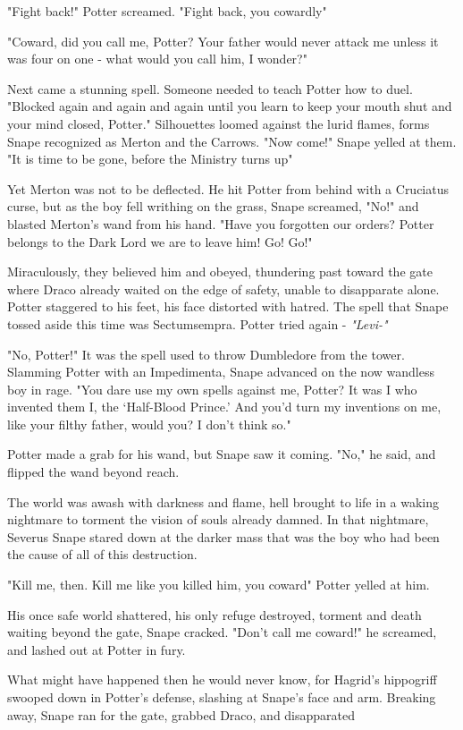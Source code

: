 "Fight back!" Potter screamed. "Fight back, you cowardly{\el}"

"Coward, did you call me, Potter? Your father would never attack me unless it was four on one - what would you call him, I wonder?"

Next came a stunning spell. Someone needed to teach Potter how to duel. "Blocked again and again and again until you learn to keep your mouth shut and your mind closed, Potter." Silhouettes loomed against the lurid flames, forms Snape recognized as Merton and the Carrows. "Now come!" Snape yelled at them. "It is time to be gone, before the Ministry turns up{\el}"

Yet Merton was not to be deflected. He hit Potter from behind with a Cruciatus curse, but as the boy fell writhing on the grass, Snape screamed, "No!" and blasted Merton's wand from his hand. "Have you forgotten our orders? Potter belongs to the Dark Lord{\el} we are to leave him! Go! Go!"

Miraculously, they believed him and obeyed, thundering past toward the gate where Draco already waited on the edge of safety, unable to disapparate alone. Potter staggered to his feet, his face distorted with hatred. The spell that Snape tossed aside this time was Sectumsempra. Potter tried again - \emph{"Levi-"}

"No, Potter!" It was the spell used to throw Dumbledore from the tower. Slamming Potter with an Impedimenta, Snape advanced on the now wandless boy in rage. "You dare use my own spells against me, Potter? It was I who invented them{\el} I, the `Half-Blood Prince.' And you'd turn my inventions on me, like your filthy father, would you? I don't think so."

Potter made a grab for his wand, but Snape saw it coming. "No," he said, and flipped the wand beyond reach.

The world was awash with darkness and flame, hell brought to life in a waking nightmare to torment the vision of souls already damned. In that nightmare, Severus Snape stared down at the darker mass that was the boy who had been the cause of all of this destruction.

"Kill me, then. Kill me like you killed him, you coward{\el}" Potter yelled at him.

His once safe world shattered, his only refuge destroyed, torment and death waiting beyond the gate, Snape cracked. "Don't call me coward!" he screamed, and lashed out at Potter in fury.

What might have happened then he would never know, for Hagrid's hippogriff swooped down in Potter's defense, slashing at Snape's face and arm. Breaking away, Snape ran for the gate, grabbed Draco, and disapparated{\el}


